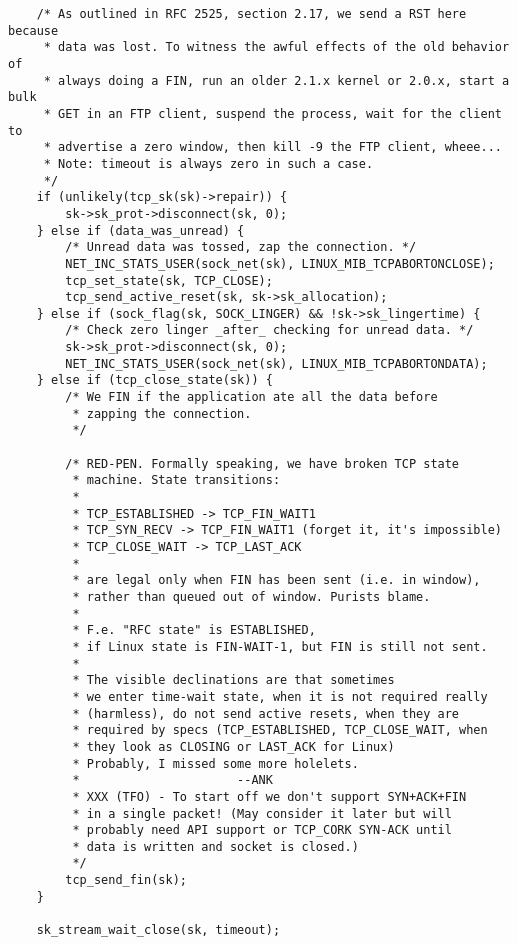 \begin{verbatim}
	/* As outlined in RFC 2525, section 2.17, we send a RST here because
	 * data was lost. To witness the awful effects of the old behavior of
	 * always doing a FIN, run an older 2.1.x kernel or 2.0.x, start a bulk
	 * GET in an FTP client, suspend the process, wait for the client to
	 * advertise a zero window, then kill -9 the FTP client, wheee...
	 * Note: timeout is always zero in such a case.
	 */
	if (unlikely(tcp_sk(sk)->repair)) {
		sk->sk_prot->disconnect(sk, 0);
	} else if (data_was_unread) {
		/* Unread data was tossed, zap the connection. */
		NET_INC_STATS_USER(sock_net(sk), LINUX_MIB_TCPABORTONCLOSE);
		tcp_set_state(sk, TCP_CLOSE);
		tcp_send_active_reset(sk, sk->sk_allocation);
	} else if (sock_flag(sk, SOCK_LINGER) && !sk->sk_lingertime) {
		/* Check zero linger _after_ checking for unread data. */
		sk->sk_prot->disconnect(sk, 0);
		NET_INC_STATS_USER(sock_net(sk), LINUX_MIB_TCPABORTONDATA);
	} else if (tcp_close_state(sk)) {
		/* We FIN if the application ate all the data before
		 * zapping the connection.
		 */

		/* RED-PEN. Formally speaking, we have broken TCP state
		 * machine. State transitions:
		 *
		 * TCP_ESTABLISHED -> TCP_FIN_WAIT1
		 * TCP_SYN_RECV	-> TCP_FIN_WAIT1 (forget it, it's impossible)
		 * TCP_CLOSE_WAIT -> TCP_LAST_ACK
		 *
		 * are legal only when FIN has been sent (i.e. in window),
		 * rather than queued out of window. Purists blame.
		 *
		 * F.e. "RFC state" is ESTABLISHED,
		 * if Linux state is FIN-WAIT-1, but FIN is still not sent.
		 *
		 * The visible declinations are that sometimes
		 * we enter time-wait state, when it is not required really
		 * (harmless), do not send active resets, when they are
		 * required by specs (TCP_ESTABLISHED, TCP_CLOSE_WAIT, when
		 * they look as CLOSING or LAST_ACK for Linux)
		 * Probably, I missed some more holelets.
		 * 						--ANK
		 * XXX (TFO) - To start off we don't support SYN+ACK+FIN
		 * in a single packet! (May consider it later but will
		 * probably need API support or TCP_CORK SYN-ACK until
		 * data is written and socket is closed.)
		 */
		tcp_send_fin(sk);
	}

	sk_stream_wait_close(sk, timeout);
\end{verbatim}

